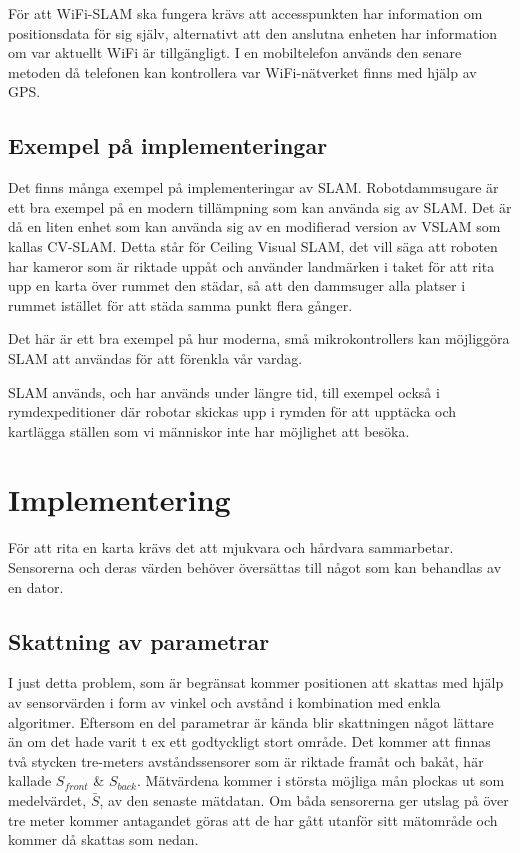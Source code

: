 \documentclass[a4paper,12pt,fleqn]{article}
\begin{document}
För att WiFi-SLAM ska fungera krävs att accesspunkten har information om positionsdata för sig själv, alternativt att den anslutna enheten har information om var aktuellt WiFi är tillgängligt. I en mobiltelefon används den senare metoden då telefonen kan kontrollera var WiFi-nätverket finns med hjälp av GPS. 

\subsection{Exempel på implementeringar}

Det finns många exempel på implementeringar av SLAM. Robotdammsugare är ett bra exempel på en modern tillämpning som kan använda sig av SLAM. Det är då en liten enhet som kan använda sig av en modifierad version av VSLAM som kallas CV-SLAM. Detta står för Ceiling Visual SLAM, det vill säga att roboten har kameror som är riktade uppåt och använder landmärken i taket för att rita upp en karta över rummet den städar, så att den dammsuger alla platser i rummet istället för att städa samma punkt flera gånger. 

Det här är ett bra exempel på hur moderna, små mikrokontrollers kan möjliggöra SLAM att användas för att förenkla vår vardag.  

SLAM används, och har används under längre tid, till exempel också i rymdexpeditioner där robotar skickas upp i rymden för att upptäcka och kartlägga ställen som vi människor inte har möjlighet att besöka. 

\newpage
\section{Implementering}

För att rita en karta krävs det att mjukvara och hårdvara sammarbetar. Sensorerna och deras värden behöver översättas till något som kan behandlas av en dator. 


\subsection{Skattning av parametrar}

I just detta problem, som är begränsat kommer positionen att skattas med hjälp av sensorvärden i form av vinkel och avstånd i kombination med enkla algoritmer. Eftersom en del parametrar är kända blir skattningen något lättare än om det hade varit t ex ett godtyckligt stort område. Det kommer att finnas två stycken tre-meters avståndssensorer som är riktade framåt och bakåt, här kallade $S_{front}$ \& $S_{back}$. Mätvärdena kommer i största möjliga mån plockas ut som medelvärdet, $\bar{S}$, av den senaste mätdatan. Om båda sensorerna ger utslag på över tre meter kommer antagandet göras att de har gått utanför sitt mätområde och kommer då skattas som nedan. 
\end{document}
